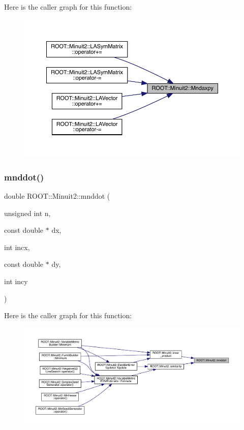 Here is the caller graph for this function\+:\nopagebreak
\begin{figure}[H]
\begin{center}
\leavevmode
\includegraphics[width=350pt]{d6/d3a/namespaceROOT_1_1Minuit2_a4784db8e0b280e76eb6f8b00e2b395dd_icgraph}
\end{center}
\end{figure}
\mbox{\label{namespaceROOT_1_1Minuit2_a2226faf256d69bf5b922caad1380c34e}} 
\subsubsection{\texorpdfstring{mnddot()}{mnddot()}}
{\footnotesize\ttfamily double R\+O\+O\+T\+::\+Minuit2\+::mnddot (\begin{DoxyParamCaption}\item[{unsigned int}]{n,  }\item[{const double $\ast$}]{dx,  }\item[{int}]{incx,  }\item[{const double $\ast$}]{dy,  }\item[{int}]{incy }\end{DoxyParamCaption})}

Here is the caller graph for this function\+:\nopagebreak
\begin{figure}[H]
\begin{center}
\leavevmode
\includegraphics[width=350pt]{d6/d3a/namespaceROOT_1_1Minuit2_a2226faf256d69bf5b922caad1380c34e_icgraph}
\end{center}
\end{figure}
\mbox{\label{namespaceROOT_1_1Minuit2_a8d430fbbb8b24669bd04e922230451ff}} 
